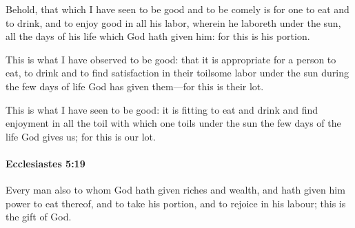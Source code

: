			\begin{versebox}
					\item[BHS] 
					\item[LXX] 
					\item[ASV] Behold, that which I have seen to be good and to be comely is for one to eat and to drink, and to enjoy good in all his labor, wherein he laboreth under the sun, all the days of his life which God hath given him: for this is his portion.
					\item[NIV] This is what I have observed to be good: that it is appropriate for a person to eat, to drink and to find satisfaction in their toilsome labor under the sun during the few days of life God has given them—for this is their lot.
					\item[NRSV] This is what I have seen to be good: it is fitting to eat and drink and find enjoyment in all the toil with which one toils under the sun the few days of the life God gives us; for this is our lot.
			\end{versebox}

		\paragraph{Ecclesiastes 5:19} %
			\label{ECCLESIASTES-5-19}

			Every man also to whom God hath given riches and wealth, and hath given him power to eat thereof, and to take his portion, and to rejoice in his labour; this is the gift of God.

